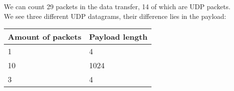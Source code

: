 We can count 29 packets in the data transfer, 14 of which are UDP packets. \\
We see three different UDP datagrams, their difference lies in the payload: \\

\begin{center}
\begin{tabular}{| l | l |}
    \hline
    Amount of packets & Payload length \\ \hline
    1 & 4 \\ \hline
    10 & 1024 \\ \hline
    3 & 4 \\ \hline
\end{tabular}
\end{center}

